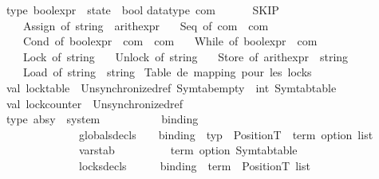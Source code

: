 \begin{isabellebody}
type\ bool{\isacharunderscore}{\kern0pt}expr\ {\isacharequal}{\kern0pt}\ state\ {\isacharminus}{\kern0pt}{\isachargreater}{\kern0pt}\ bool\isanewline
\isanewline
datatype\ com\ {\isacharequal}{\kern0pt}\ \isanewline
\ \ \ \ SKIP\isanewline
\ \ {\isacharbar}{\kern0pt}\ Assign\ of\ string\ {\isacharasterisk}{\kern0pt}\ arith{\isacharunderscore}{\kern0pt}expr\isanewline
\ \ {\isacharbar}{\kern0pt}\ Seq\ of\ com\ {\isacharasterisk}{\kern0pt}\ com\ \ \isanewline
\ \ {\isacharbar}{\kern0pt}\ Cond\ of\ bool{\isacharunderscore}{\kern0pt}expr\ {\isacharasterisk}{\kern0pt}\ com\ {\isacharasterisk}{\kern0pt}\ com\isanewline
\ \ {\isacharbar}{\kern0pt}\ While\ of\ bool{\isacharunderscore}{\kern0pt}expr\ {\isacharasterisk}{\kern0pt}\ com\isanewline
\ \ {\isacharbar}{\kern0pt}\ Lock\ of\ string\isanewline
\ \ {\isacharbar}{\kern0pt}\ Unlock\ of\ string\isanewline
\ \ {\isacharbar}{\kern0pt}\ Store\ of\ arith{\isacharunderscore}{\kern0pt}expr\ {\isacharasterisk}{\kern0pt}\ string\isanewline
\ \ {\isacharbar}{\kern0pt}\ Load\ of\ string\ {\isacharasterisk}{\kern0pt}\ string\isanewline
\isanewline
{\isacharparenleft}{\kern0pt}{\isacharasterisk}{\kern0pt}\ Table\ de\ mapping\ pour\ les\ locks\ {\isacharasterisk}{\kern0pt}{\isacharparenright}{\kern0pt}\isanewline
val\ lock{\isacharunderscore}{\kern0pt}table\ {\isacharequal}{\kern0pt}\ Unsynchronized{\isachardot}{\kern0pt}ref\ {\isacharparenleft}{\kern0pt}Symtab{\isachardot}{\kern0pt}empty\ {\isacharcolon}{\kern0pt}\ int\ Symtab{\isachardot}{\kern0pt}table{\isacharparenright}{\kern0pt}\isanewline
val\ lock{\isacharunderscore}{\kern0pt}counter\ {\isacharequal}{\kern0pt}\ Unsynchronized{\isachardot}{\kern0pt}ref\ {}\isanewline
{\isacharparenleft}{\kern0pt}{\isacharasterisk}{\kern0pt}\ \ \ \ \ \ \ \ \ \ \ \ \ \ \ \ \ \isanewline
type\ absy\ {\isacharequal}{\kern0pt}\ {\isacharbraceleft}{\kern0pt}system\ \ \ \ \ \ \ \ \ \ {\isacharcolon}{\kern0pt}\ binding{\isacharcomma}{\kern0pt}\isanewline
\ \ \ \ \ \ \ \ \ \ \ \ \ globals{\isacharunderscore}{\kern0pt}decls\ \ \ {\isacharcolon}{\kern0pt}\ {\isacharparenleft}{\kern0pt}binding\ {\isacharasterisk}{\kern0pt}\ typ\ {\isacharasterisk}{\kern0pt}\ Position{\isachardot}{\kern0pt}T\ {\isacharasterisk}{\kern0pt}\ term\ option{\isacharparenright}{\kern0pt}\ list{\isacharcomma}{\kern0pt}\isanewline
\ \ \ \ \ \ \ \ \ \ \ \ \ varstab\ \ \ \ \ \ \ \ \ {\isacharcolon}{\kern0pt}\ {\isacharparenleft}{\kern0pt}term\ option{\isacharparenright}{\kern0pt}\ Symtab{\isachardot}{\kern0pt}table{\isacharcomma}{\kern0pt}\isanewline
\ \ \ \ \ \ \ \ \ \ \ \ \ locks{\isacharunderscore}{\kern0pt}decls\ \ \ \ \ {\isacharcolon}{\kern0pt}\ {\isacharparenleft}{\kern0pt}binding\ {\isacharasterisk}{\kern0pt}\ term\ {\isacharasterisk}{\kern0pt}\ Position{\isachardot}{\kern0pt}T{\isacharparenright}{\kern0pt}\ list{\isacharcomma}{\kern0pt}\isanewline

\end{isabellebody}
